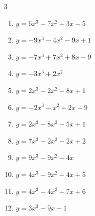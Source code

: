 \begin{multicols}{3}
\begin{enumerate}

\columnbreak %

\resetques

  \item $y=6x^{3}+7x^{2}+3x-5$


  \item $y=-9x^{3}-4x^{2}-9x+1$


  \item $y=-7x^{3}+7x^{2}+8x-9$


  \item $y=-3x^{3}+2x^{2}$


  \item $y=2x^{3}+2x^{2}-8x+1$


  \item $y=-2x^{3}-x^{2}+2x-9$


  \item $y=2x^{3}-8x^{2}-5x+1$


  \item $y=7x^{3}+2x^{2}-2x+2$


  \item $y=9x^{3}-9x^{2}-4x$


  \item $y=4x^{3}+9x^{2}+4x+5$


  \item $y=4x^{3}+4x^{2}+7x+6$


  \item $y=3x^{3}+9x-1$


\end{enumerate}
\end{multicols}
